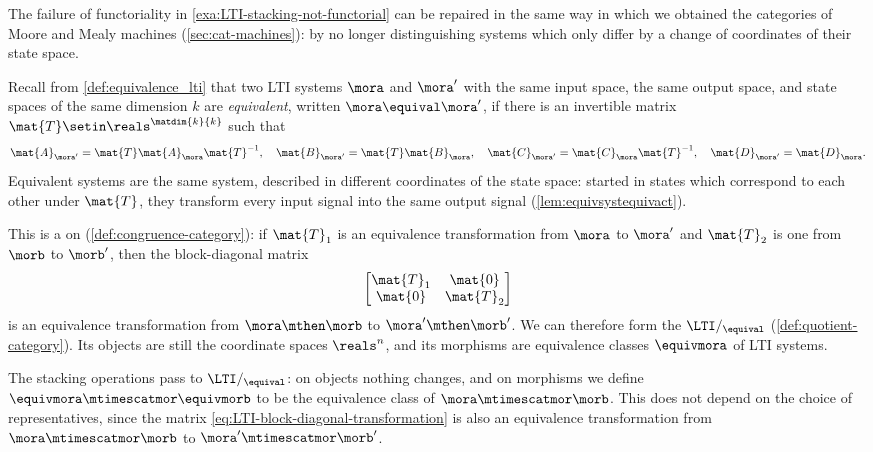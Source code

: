 \begin{example}
    \label{exa:LTI-quotient-strict-monoidal}
    The failure of functoriality in \cref{exa:LTI-stacking-not-functorial} can be repaired in the same way in which we obtained the categories of Moore and Mealy machines (\cref{sec:cat-machines}): by no longer distinguishing systems which only differ by a change of coordinates of their state space.

    Recall from \cref{def:equivalence_lti} that two LTI systems $\mora$ and $\mora'$ with the same input space, the same output space, and state spaces of the same dimension $k$ are \emph{equivalent}, written $\mora \equival \mora'$, if there is an invertible matrix $\mat{T} \setin \reals^{\matdim{k}{k}}$ such that
    \begin{equation}
        \mat{A}_{\mora'} = \mat{T}\mat{A}_\mora \mat{T}^{-1}, \quad \mat{B}_{\mora'} = \mat{T}\mat{B}_\mora, \quad \mat{C}_{\mora'} =\mat{C}_\mora\mat{T}^{-1},\quad \mat{D}_{\mora'}=\mat{D}_\mora.
    \end{equation}
    Equivalent systems are the same system, described in different coordinates of the state space: started in states which correspond to each other under $\mat{T}$, they transform every input signal into the same output signal (\cref{lem:equivsystequivact}).

    This  is a  on \LTI (\cref{def:congruence-category}): if $\mat{T}_1$ is an equivalence transformation from $\mora$ to $\mora'$ and $\mat{T}_2$ is one from $\morb$ to $\morb'$, then the block-diagonal matrix
    \begin{equation}
        \label{eq:LTI-block-diagonal-transformation}
        \begin{bmatrix}
            \mat{T}_1 & \mat{0}   \\
            \mat{0}   & \mat{T}_2
        \end{bmatrix}
    \end{equation}
    is an equivalence transformation from $\mora \mthen \morb$ to $\mora' \mthen \morb'$.
    We can therefore form the  $\LTI/_{\equival}$ (\cref{def:quotient-category}).
    Its objects are still the coordinate spaces $\reals^n$, and its morphisms are equivalence classes $\equivmora$ of LTI systems.

    The stacking operations pass to $\LTI/_{\equival}$: on objects nothing changes, and on morphisms we define $\equivmora \mtimescatmor \equivmorb$ to be the equivalence class of $\mora \mtimescatmor \morb$.
    This does not depend on the choice of representatives, since the matrix \cref{eq:LTI-block-diagonal-transformation} is also an equivalence transformation from $\mora \mtimescatmor \morb$ to $\mora' \mtimescatmor \morb'$.


\end{example}
